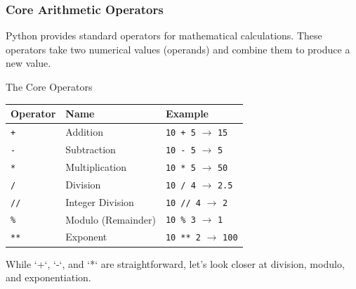 \documentclass{beamer}
\begin{document}
\begin{frame}[fragile]
    \frametitle{Core Arithmetic Operators}
    Python provides standard operators for mathematical calculations. These operators take two numerical values (operands) and combine them to produce a new value.
    \vspace{1em}

    \begin{block}{The Core Operators}
        \centering
        \begin{tabular}{ l l l }
            \textbf{Operator} & \textbf{Name} & \textbf{Example} \\
            \hline
            \texttt{+} & Addition & \texttt{10 + 5} $\rightarrow$ \texttt{15} \\
            \texttt{-} & Subtraction & \texttt{10 - 5} $\rightarrow$ \texttt{5} \\
            \texttt{*} & Multiplication & \texttt{10 * 5} $\rightarrow$ \texttt{50} \\
            \texttt{/} & Division & \texttt{10 / 4} $\rightarrow$ \texttt{2.5} \\
            \texttt{//} & Integer Division & \texttt{10 // 4} $\rightarrow$ \texttt{2} \\
            \texttt{\%} & Modulo (Remainder) & \texttt{10 \% 3} $\rightarrow$ \texttt{1} \\
            \texttt{**} & Exponent & \texttt{10 ** 2} $\rightarrow$ \texttt{100} \\
        \end{tabular}
    \end{block}

    \vspace{1em}
    While `+`, `-`, and `*` are straightforward, let's look closer at division, modulo, and exponentiation.
\end{frame}
\end{document}
